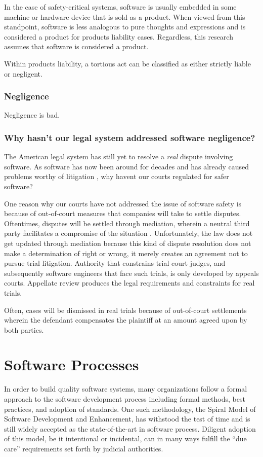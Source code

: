 \documentclass[12pt]{report}
\begin{document}
In the case of safety-critical systems, software is usually embedded in some machine or hardware device \cite{FAKE} that is sold as a product. When viewed from this standpoint, software is less analogous to pure thoughts and expressions and is considered a product for products liability cases. Regardless, this research assumes that software is considered a product. 

Within products liability, a tortious act can be classified as either strictly liable or negligent. 

\subsubsection{Negligence} 
Negligence is bad. 

\subsubsection{Why hasn't our legal system addressed software negligence?} 

The American legal system has still yet to resolve a \textit{real} dispute involving software. As software has now been around for decades and has already caused problems worthy of litigation \cite{FAKE}, why havent our courts regulated for safer software? 

One reason why our courts have not addressed the issue of software safety is because of out-of-court measures that companies will take to settle disputes. Oftentimes, disputes will be settled through mediation, wherein a neutral third party facilitates a compromise of the situation \cite{FAKE}. Unfortunately, the law does not get updated through mediation because this kind of dispute resolution does not make a determination of right or wrong, it merely creates an agreement not to pursue trial litigation. Authority that constrains trial court judges, and subsequently software engineers that face such trials, is only developed by appeals courts. Appellate review produces the legal requirements and constraints for real trials. 

Often, cases will be dismissed in real trials because of out-of-court settlements wherein the defendant compensates the plaintiff at an amount agreed upon by both parties. 

\section{Software Processes} 
In order to build quality software systems, many organizations follow a formal approach to the software development process including formal methods, best practices, and adoption of standards. One such methodology, the Spiral Model of Software Development and Enhancement, has withstood the test of time and is still widely accepted as the state-of-the-art in software process. Diligent adoption of this model, be it intentional or incidental, can in many ways fulfill the ``due care'' requirements set forth by judicial authorities. 
\end{document}
